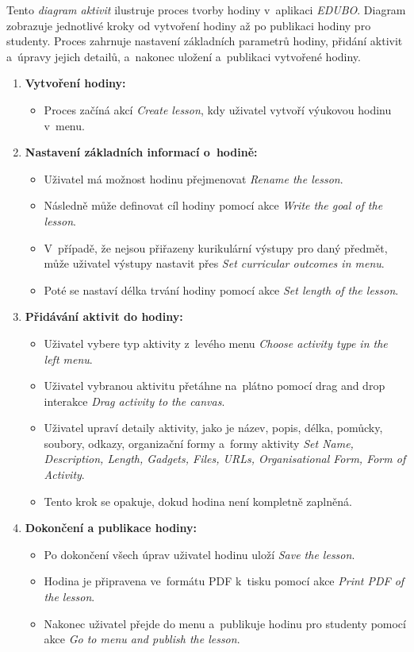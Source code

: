 \documentclass[male,czech,api_bc]{kitheses}
\begin{document}
Tento \textit{diagram aktivit} ilustruje proces tvorby hodiny v~aplikaci \textit{EDUBO}. Diagram zobrazuje jednotlivé kroky od vytvoření hodiny až po publikaci hodiny pro studenty. Proces zahrnuje nastavení základních parametrů hodiny, přidání aktivit a~úpravy jejich detailů, a~nakonec uložení a~publikaci vytvořené hodiny.

\begin{enumerate}
	\item \textbf{Vytvoření hodiny:}
	\begin{itemize}
		\item Proces začíná akcí \textit{Create lesson}, kdy uživatel vytvoří výukovou hodinu v~menu.
	\end{itemize}
	
	\item \textbf{Nastavení základních informací o~hodině:}
	\begin{itemize}
		\item Uživatel má možnost hodinu přejmenovat \textit{Rename the lesson}.
		\item Následně může definovat cíl hodiny pomocí akce \textit{Write the goal of the lesson}.
		\item V~případě, že nejsou přiřazeny kurikulární výstupy pro daný předmět, může uživatel výstupy nastavit přes \textit{Set curricular outcomes in menu}.
		\item Poté se nastaví délka trvání hodiny pomocí akce \textit{Set length of the lesson}.
	\end{itemize}
	
	\item \textbf{Přidávání aktivit do hodiny:}
	\begin{itemize}
		\item Uživatel vybere typ aktivity z~levého menu \textit{Choose activity type in the left menu}.
		\item Uživatel vybranou aktivitu přetáhne na~plátno pomocí drag and drop interakce \textit{Drag activity to the canvas}.
		\item Uživatel upraví detaily aktivity, jako je název, popis, délka, pomůcky, soubory, odkazy, organizační formy a~formy aktivity \textit{Set Name, Description, Length, Gadgets, Files, URLs, Organisational Form, Form of Activity}.
		\item Tento krok se opakuje, dokud hodina není kompletně zaplněná.
	\end{itemize}
	
	\item \textbf{Dokončení a publikace hodiny:}
	\begin{itemize}
		\item Po dokončení všech úprav uživatel hodinu uloží \textit{Save the lesson}.
		\item Hodina je připravena ve~formátu PDF k~tisku pomocí akce \textit{Print PDF of the lesson}.
		\item Nakonec uživatel přejde do menu a~publikuje hodinu pro studenty pomocí akce \textit{Go to menu and publish the lesson}.
	\end{itemize}
\end{enumerate}
\end{document}
